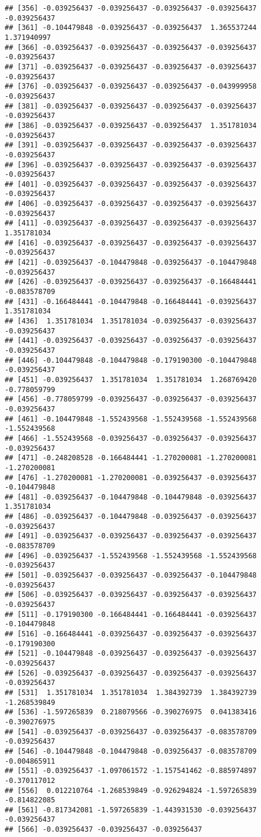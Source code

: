 \documentclass[
]{article}
\begin{document}
\begin{verbatim}
## [356] -0.039256437 -0.039256437 -0.039256437 -0.039256437 -0.039256437
## [361] -0.104479848 -0.039256437 -0.039256437  1.365537244  1.371940997
## [366] -0.039256437 -0.039256437 -0.039256437 -0.039256437 -0.039256437
## [371] -0.039256437 -0.039256437 -0.039256437 -0.039256437 -0.039256437
## [376] -0.039256437 -0.039256437 -0.039256437 -0.043999958 -0.039256437
## [381] -0.039256437 -0.039256437 -0.039256437 -0.039256437 -0.039256437
## [386] -0.039256437 -0.039256437 -0.039256437  1.351781034 -0.039256437
## [391] -0.039256437 -0.039256437 -0.039256437 -0.039256437 -0.039256437
## [396] -0.039256437 -0.039256437 -0.039256437 -0.039256437 -0.039256437
## [401] -0.039256437 -0.039256437 -0.039256437 -0.039256437 -0.039256437
## [406] -0.039256437 -0.039256437 -0.039256437 -0.039256437 -0.039256437
## [411] -0.039256437 -0.039256437 -0.039256437 -0.039256437  1.351781034
## [416] -0.039256437 -0.039256437 -0.039256437 -0.039256437 -0.039256437
## [421] -0.039256437 -0.104479848 -0.039256437 -0.104479848 -0.039256437
## [426] -0.039256437 -0.039256437 -0.039256437 -0.166484441 -0.083578709
## [431] -0.166484441 -0.104479848 -0.166484441 -0.039256437  1.351781034
## [436]  1.351781034  1.351781034 -0.039256437 -0.039256437 -0.039256437
## [441] -0.039256437 -0.039256437 -0.039256437 -0.039256437 -0.039256437
## [446] -0.104479848 -0.104479848 -0.179190300 -0.104479848 -0.039256437
## [451] -0.039256437  1.351781034  1.351781034  1.268769420 -0.778059799
## [456] -0.778059799 -0.039256437 -0.039256437 -0.039256437 -0.039256437
## [461] -0.104479848 -1.552439568 -1.552439568 -1.552439568 -1.552439568
## [466] -1.552439568 -0.039256437 -0.039256437 -0.039256437 -0.039256437
## [471] -0.248208528 -0.166484441 -1.270200081 -1.270200081 -1.270200081
## [476] -1.270200081 -1.270200081 -0.039256437 -0.039256437 -0.104479848
## [481] -0.039256437 -0.104479848 -0.104479848 -0.039256437  1.351781034
## [486] -0.039256437 -0.104479848 -0.039256437 -0.039256437 -0.039256437
## [491] -0.039256437 -0.039256437 -0.039256437 -0.039256437 -0.083578709
## [496] -0.039256437 -1.552439568 -1.552439568 -1.552439568 -0.039256437
## [501] -0.039256437 -0.039256437 -0.039256437 -0.104479848 -0.039256437
## [506] -0.039256437 -0.039256437 -0.039256437 -0.039256437 -0.039256437
## [511] -0.179190300 -0.166484441 -0.166484441 -0.039256437 -0.104479848
## [516] -0.166484441 -0.039256437 -0.039256437 -0.039256437 -0.179190300
## [521] -0.104479848 -0.039256437 -0.039256437 -0.039256437 -0.039256437
## [526] -0.039256437 -0.039256437 -0.039256437 -0.039256437 -0.039256437
## [531]  1.351781034  1.351781034  1.384392739  1.384392739 -1.268539849
## [536] -1.597265839  0.218079566 -0.390276975  0.041383416 -0.390276975
## [541] -0.039256437 -0.039256437 -0.039256437 -0.083578709 -0.039256437
## [546] -0.104479848 -0.104479848 -0.039256437 -0.083578709 -0.004865911
## [551] -0.039256437 -1.097061572 -1.157541462 -0.885974897 -0.370117012
## [556]  0.012210764 -1.268539849 -0.926294824 -1.597265839 -0.814822085
## [561] -0.817342081 -1.597265839 -1.443931530 -0.039256437 -0.039256437
## [566] -0.039256437 -0.039256437 -0.039256437
\end{verbatim}
\end{document}
